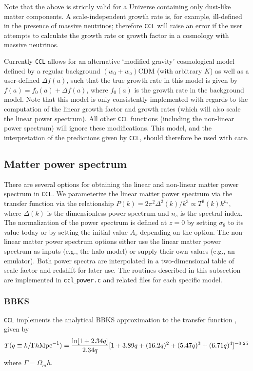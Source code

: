 \documentclass[\docopts]{\docclass}
\newcommand{\ccl}{{\tt CCL}\xspace}
\begin{document}
Note that the above is strictly valid for a Universe containing only dust-like matter components. A scale-independent growth rate is, for example, ill-defined in the presence of massive neutrinos; therefore \ccl will raise an error if the user attempts to calculate the growth rate or growth factor in a cosmology with massive neutrinos.

Currently \ccl allows for an alternative `modified gravity' cosmological model defined by a regular background $(w_0+w_a)$CDM (with arbitrary $K$) as well as a user-defined $\Delta f(a)$, such that the true growth rate in this model is given by $f(a)=f_0(a)+\Delta f(a)$, where $f_0(a)$ is the growth rate in the background model. Note that this model is only consistently implemented with regards to the computation of the linear growth factor and growth rates (which will also scale the linear power spectrum). All other \ccl functions (including the non-linear power spectrum) will ignore these modifications. This model, and the interpretation of the predictions given by \ccl, should therefore be used with care.

\subsection{Matter power spectrum}
\label{sec:power}

There are several options for obtaining the linear and non-linear matter power spectrum in \ccl.
We parameterize the linear matter power spectrum via the transfer function via the relationship
$P(k) = 2 \pi^2 \Delta^2(k) /k^3  \propto T^2(k) k^{n_s}$, where $\Delta(k)$ is the dimensionless power
spectrum and $n_s$ is the spectral index. The normalization of the power spectrum is defined at $z=0$ by
setting $\sigma_8$ to its value today or by setting the initial value $A_s$ depending on the option.
The non-linear matter power spectrum options either use the linear matter power spectrum as inputs (e.g., the halo model)
or supply their own values (e.g., an emulator). Both power spectra are interpolated in a two-dimensional
table of scale factor and redshift for later use. The routines described in this subsection are
implemented in {\tt ccl$\_$power.c} and related files for each specific model.

\subsubsection{BBKS}
\ccl implements the analytical BBKS approximation to the transfer function \citep{BBKS}, given by
\begin{equation}
T(q\equiv k/\Gamma h {\rm Mpc}^{-1}) = \frac{\ln[1+2.34q]}{2.34q}[1+3.89q+(16.2q)^2+(5.47q)^3+(6.71q)^4]^{-0.25}
\end{equation}
where $\Gamma = \Omega_m h$.
\end{document}
